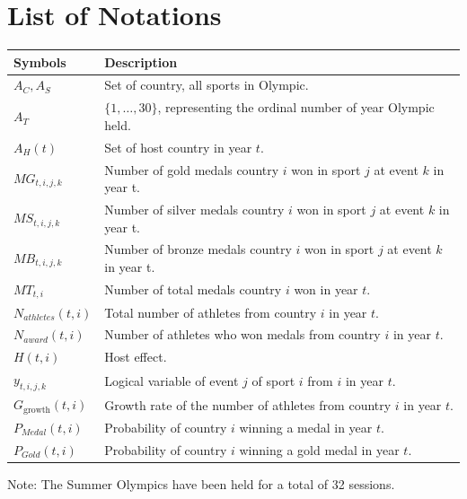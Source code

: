 \documentclass{mcmthesis}
\begin{document}
\section{List of Notations}
\begin{center}
\begin{tabular}{ll}
	\toprule
	{\bf Symbols} & {\bf Description}  \\
	\midrule 
	$A_{C},A_{S}$ & Set of country, all sports in Olympic.\\
	$A_{T}$ & $\{1,\dots,30\}$, representing the ordinal number of year Olympic held. \\
	$A_{H}(t)$ & Set of host country in year $t$. \\
	$MG_{t,i,j,k}$ & Number of gold medals country $i$ won in sport $j$ at event $k$ in year t. \\
	$MS_{t,i,j,k}$ & Number of silver medals country $i$ won in sport $j$ at event $k$ in year t. \\
	$MB_{t,i,j,k}$ & Number of bronze medals country $i$ won in sport $j$ at event $k$ in year t. \\
	$MT_{t,i}$ & Number of total medals country $i$ won in year $t$. \\
	$N_{athletes}(t,i)$ & Total number of athletes from country $i$ in year $t$. \\
	$N_{award}(t,i)$ & Number of athletes who won medals from country $i$ in year $t$. \\
	$H(t,i)$ & Host effect. \\
	$y_{t,i,j,k}$ &  Logical variable of event $j$ of sport $i$ from $i$ in year $t$. \\
	$G_{\text{growth}}(t,i)$ & Growth rate of the number of athletes from country $i$ in year $t$.\\
	$P_{Medal}(t,i)$ & Probability of country $i$ winning a medal in year $t$.\\
	$P_{Gold}(t,i)$ & Probability of country $i$ winning a gold medal in year $t$.\\
	\bottomrule
\end{tabular}
\end{center}

\noindent Note: The Summer Olympics have been held for a total of 32 sessions.












\end{document}
